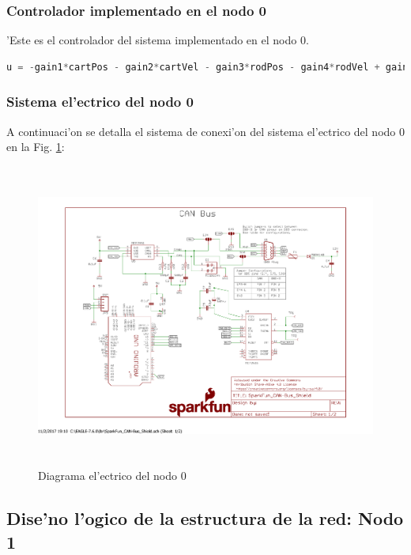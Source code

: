 \subsubsection{Controlador implementado en el nodo 0}
'Este es el controlador del sistema implementado en el nodo 0.
{\footnotesize
\begin{lstlisting}[language=C]
u = -gain1*cartPos - gain2*cartVel - gain3*rodPos - gain4*rodVel + gain5*error;

 \end{lstlisting}
}



\subsubsection{Sistema el'ectrico del nodo 0}

A continuaci'on se detalla el sistema de conexi'on del sistema el'ectrico del nodo 0 en la Fig. \ref{fig:nodo0electric}:
\begin{center}
\begin{figure}[ht]
	\centering
		\includegraphics[width=14cm, height=10cm]{nodo0elec}
	\caption{Diagrama el'ectrico del nodo 0}
	\label{fig:nodo0electric}
\end{figure}
\end{center}

\subsection{Dise'no l'ogico de la estructura de la red: Nodo 1}

